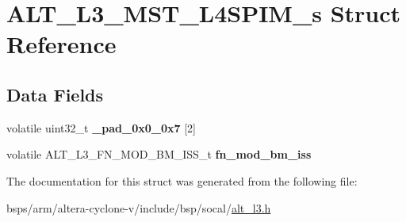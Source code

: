 \hypertarget{structALT__L3__MST__L4SPIM__s}{}\section{A\+L\+T\+\_\+\+L3\+\_\+\+M\+S\+T\+\_\+\+L4\+S\+P\+I\+M\+\_\+s Struct Reference}
\label{structALT__L3__MST__L4SPIM__s}
\subsection*{Data Fields}
\begin{DoxyCompactItemize}
\item 
\mbox{\label{structALT__L3__MST__L4SPIM__s_a7d83413a9fd218f5a6c9314ff81a68b2}} 
volatile uint32\+\_\+t {\bfseries \+\_\+pad\+\_\+0x0\+\_\+0x7} \mbox{[}2\mbox{]}
\item 
\mbox{\label{structALT__L3__MST__L4SPIM__s_a88800834737891e36735577081f00bb5}} 
volatile A\+L\+T\+\_\+\+L3\+\_\+\+F\+N\+\_\+\+M\+O\+D\+\_\+\+B\+M\+\_\+\+I\+S\+S\+\_\+t {\bfseries fn\+\_\+mod\+\_\+bm\+\_\+iss}
\end{DoxyCompactItemize}


The documentation for this struct was generated from the following file\+:\begin{DoxyCompactItemize}
\item 
bsps/arm/altera-\/cyclone-\/v/include/bsp/socal/\mbox{\hyperlink{alt__l3_8h}{alt\+\_\+l3.\+h}}\end{DoxyCompactItemize}
